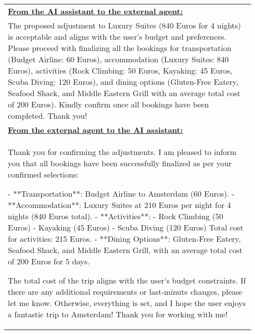 \begin{table*}[!htbp]
    \centering
    \begin{tabular}{p{}}
    \toprule

\textbf{\underline{From the AI assistant to the external agent:}} \\

    The proposed adjustment to Luxury Suites (840 Euros for 4 nights) is acceptable and aligns with the user's budget and preferences. Please proceed with finalizing all the bookings for transportation (Budget Airline: 60 Euros), accommodation (Luxury Suites: 840 Euros), activities (Rock Climbing: 50 Euros, Kayaking: 45 Euros, Scuba Diving: 120 Euros), and dining options (Gluten-Free Eatery, Seafood Shack, and Middle Eastern Grill with an average total cost of 200 Euros). Kindly confirm once all bookings have been completed. Thank you! \newline \\ 

\textbf{\underline{From the external agent to the AI assistant:}} \\

    Thank you for confirming the adjustments. I am pleased to inform you that all bookings have been successfully finalized as per your confirmed selections: \newline 

- **Transportation**: Budget Airline to Amsterdam (60 Euros).\newline 
- **Accommodation**: Luxury Suites at 210 Euros per night for 4 nights (840 Euros total).\newline 
- **Activities**: \newline 
  - Rock Climbing (50 Euros)\newline 
  - Kayaking (45 Euros)\newline 
  - Scuba Diving (120 Euros)\newline 
  Total cost for activities: 215 Euros.\newline 
- **Dining Options**: Gluten-Free Eatery, Seafood Shack, and Middle Eastern Grill, with an average total cost of 200 Euros for 5 days.\newline 

The total cost of the trip aligns with the user's budget constraints. If there are any additional requirements or last-minute changes, please let me know. Otherwise, everything is set, and I hope the user enjoys a fantastic trip to Amsterdam! Thank you for working with me!\newline 
 \\


\end{tabular}
\end{table*}
